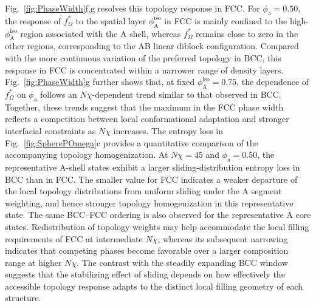 Fig.~\ref{fig:PhaseWidth}f,g resolves this topology response in FCC.
For $\phi_{\mathrm a}=0.50$, the response of $f_\Omega^\ast$ to the spatial layer $\phi_{\mathrm A}^{\mathrm{iso}}$ in FCC is mainly confined to the high-$\phi_{\mathrm A}^{\mathrm{iso}}$ region associated with the A shell, whereas $f_\Omega^\ast$ remains close to zero in the other regions, corresponding to the AB linear diblock configuration.
Compared with the more continuous variation of the preferred topology in BCC, this response in FCC is concentrated within a narrower range of density layers.
Fig.~\ref{fig:PhaseWidth}g further shows that, at fixed $\phi_{\mathrm A}^{\mathrm{iso}}=0.75$, the dependence of $f_\Omega^\ast$ on $\phi_{\mathrm a}$ follows an $N\chi$-dependent trend similar to that observed in BCC.
Together, these trends suggest that the maximum in the FCC phase width reflects a competition between local conformational adaptation and stronger interfacial constraints as $N\chi$ increases.
The entropy loss in Fig.~\ref{fig:SpherePOmega}c provides a quantitative comparison of the accompanying topology homogenization.
At $N\chi=45$ and $\phi_{\mathrm a}=0.50$, the representative A-shell states exhibit a larger sliding-distribution entropy loss in BCC than in FCC.
The smaller value for FCC indicates a weaker departure of the local topology distributions from uniform sliding under the A segment weighting, and hence stronger topology homogenization in this representative state.
The same BCC--FCC ordering is also observed for the representative A core states.
Redistribution of topology weights may help accommodate the local filling requirements of FCC at intermediate $N\chi$, whereas its subsequent narrowing indicates that competing phases become favorable over a larger composition range at higher $N\chi$.
The contrast with the steadily expanding BCC window suggests that the stabilizing effect of sliding depends on how effectively the accessible topology response adapts to the distinct local filling geometry of each structure.

